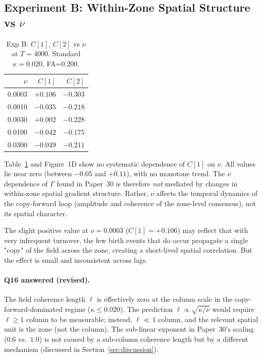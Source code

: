 \documentclass[11pt,a4paper]{article}
\begin{document}
\subsection{Experiment B: Within-Zone Spatial Structure vs $\nu$}

\begin{table}[h]
\centering
\caption{Exp B: $C[1]$, $C[2]$ vs $\nu$ at $T=4000$.  Standard $\kappa=0.020$, FA=0.200.}
\label{tab:expB}
\begin{tabular}{r|rr}
\toprule
$\nu$ & $C[1]$ & $C[2]$ \\
\midrule
0.0003 & $+0.106$ & $-0.303$ \\
0.0010 & $-0.035$ & $-0.218$ \\
0.0030 & $+0.002$ & $-0.228$ \\
0.0100 & $-0.042$ & $-0.175$ \\
0.0300 & $-0.049$ & $-0.211$ \\
\bottomrule
\end{tabular}
\end{table}

Table~\ref{tab:expB} and Figure~1D show no systematic dependence of $C[1]$ on $\nu$.
All values lie near zero (between $-0.05$ and $+0.11$), with no monotone trend.  The
$\nu$ dependence of $\Gamma$ found in Paper~30 is therefore \emph{not} mediated by changes
in within-zone spatial gradient structure.  Rather, $\nu$ affects the temporal
dynamics of the copy-forward loop (amplitude and coherence of the zone-level consensus),
not its spatial character.

The slight positive value at $\nu=0.0003$ ($C[1]=+0.106$) may reflect that with very
infrequent turnover, the few birth events that do occur propagate a single "copy" of the
field across the zone, creating a short-lived spatial correlation.  But the effect is
small and inconsistent across lags.

\paragraph{Q16 answered (revised).}
The field coherence length $\ell$ is effectively zero at the column scale in the
copy-forward-dominated regime ($\kappa \leq 0.020$).  The prediction
$\ell \propto \sqrt{\kappa/\nu}$ would require $\ell \geq 1$ column to be measurable;
instead, $\ell \ll 1$ column, and the relevant spatial unit is the zone (not the column).
The sub-linear exponent in Paper~30's scaling ($0.6$ vs.\ $1.0$) is not caused by a
sub-column coherence length but by a different mechanism (discussed in
Section~\ref{sec:discussion}).
\end{document}
